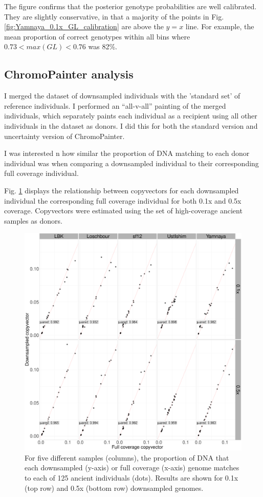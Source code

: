 The figure confirms that the posterior genotype probabilities are well calibrated. They are slightly conservative, in that a majority of the points in Fig. \ref{fig:Yamnaya_0.1x_GL_calibration} are above the $y=x$ line. For example, the mean proportion of correct genotypes within all bins where $0.73 < max(GL) < 0.76$ was 82\%.

\subsection{ChromoPainter analysis}

I merged the dataset of downsampled individuals with the 'standard set' of reference individuals. I performed an ``all-v-all'' painting of the merged individuals, which separately paints each individual as a recipient using all other individuals in the dataset as donors. I did this for both the standard version and uncertainty version of ChromoPainter.

I was interested n how similar the proportion of DNA matching to each donor individual was when comparing a downsampled individual to their corresponding full coverage individual.

Fig. \ref{fig:CP_correlation_allSamples_0.1x_0.5x_30x} displays the relationship between copyvectors for each downsampled individual the corresponding full coverage individual for both 0.1x and 0.5x coverage. Copyvectors were estimated using the set of high-coverage ancient samples as donors.

\begin{figure}[htp]
    \centering
    \includegraphics[width=1.0\textwidth]{../images/chapter1/CP_correlation_allSamples_0.1x_0.5x_30x.pdf}
    \caption{For five different samples (columns), the proportion of DNA that each downsampled (y-axis) or full coverage (x-axis) genome matches to each of 125 ancient individuals (dots). Results are shown for 0.1x (top row) and 0.5x (bottom row) downsampled genomes.}
    \label{fig:CP_correlation_allSamples_0.1x_0.5x_30x}
\end{figure}

